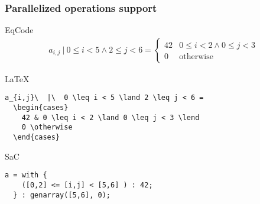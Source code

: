 \documentclass[xcolor=dvipsnames,mathserif,professionalfont,12pt]{beamer}
\begin{document}
\begin{frame}[fragile]
  \frametitle{Parallelized operations support}
    \begin{block}{EqCode}
      \begin{align*}
a_{i,j}\  |\  0 \leq i < 5 \land 2 \leq j < 6 =
\begin{cases}
42 & 0 \leq i < 2 \land 0 \leq j < 3 \\
0 & \text{otherwise}
\end{cases}
      \end{align*}
    \end{block}
      \begin{block}{\LaTeX}
      \begin{lstlisting}
a_{i,j}\  |\  0 \leq i < 5 \land 2 \leq j < 6 = 
  \begin{cases}
    42 & 0 \leq i < 2 \land 0 \leq j < 3 \lend
    0 \otherwise
  \end{cases}
      \end{lstlisting}
      \end{block}
      \begin{block}{SaC}
      \begin{lstlisting}
a = with {
    ([0,2] <= [i,j] < [5,6] ) : 42;
  } : genarray([5,6], 0);
      \end{lstlisting}
      \end{block}
\end{frame}

\end{document}
